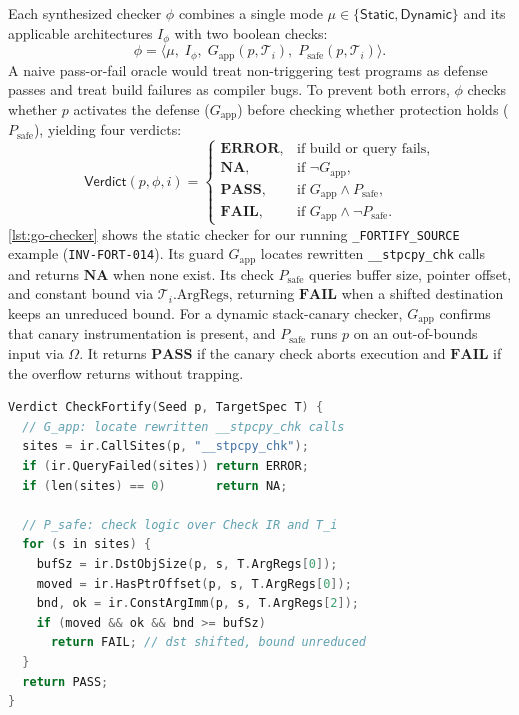 \documentclass[conference,compsoc]{IEEEtran}
\begin{document}
Each synthesized checker $\phi$ combines a single mode $\mu \in \{\mathsf{Static}, \mathsf{Dynamic}\}$ and its applicable architectures $I_\phi$ with two boolean checks:
\begin{equation}
\phi = \langle \mu,\; I_\phi,\; G_{\text{app}}(p, \mathcal{T}_i),\; P_{\text{safe}}(p, \mathcal{T}_i) \rangle.
\label{eq:pred-ir}
\end{equation}
A naive pass-or-fail oracle would treat non-triggering test programs as defense passes and treat build failures as compiler bugs. To prevent both errors, $\phi$ checks whether $p$ activates the defense ($G_{\text{app}}$) before checking whether protection holds ($P_{\text{safe}}$), yielding four verdicts:
\begin{equation}
\mathsf{Verdict}(p, \phi, i) = \begin{cases}
\mathbf{ERROR}, & \text{if build or query fails,} \\
\mathbf{NA}, & \text{if } \neg G_{\text{app}}, \\
\mathbf{PASS}, & \text{if } G_{\text{app}} \wedge P_{\text{safe}}, \\
\mathbf{FAIL}, & \text{if } G_{\text{app}} \wedge \neg P_{\text{safe}}.
\end{cases}
\label{eq:inference-rules}
\end{equation}
\autoref{lst:go-checker} shows the static checker for our running \texttt{\_FORTIFY\_SOURCE} example (\texttt{INV-FORT-014}). Its guard $G_{\text{app}}$ locates rewritten \texttt{\_\_stpcpy\_chk} calls and returns $\mathbf{NA}$ when none exist. Its check $P_{\text{safe}}$ queries buffer size, pointer offset, and constant bound via $\mathcal{T}_i.\text{ArgRegs}$, returning $\mathbf{FAIL}$ when a shifted destination keeps an unreduced bound. For a dynamic stack-canary checker, $G_{\text{app}}$ confirms that canary instrumentation is present, and $P_{\text{safe}}$ runs $p$ on an out-of-bounds input via $\Omega$. It returns $\mathbf{PASS}$ if the canary check aborts execution and $\mathbf{FAIL}$ if the overflow returns without trapping.

\begin{lstlisting}[float=t, language=C, morekeywords={return,if,for,in,len,Seed,TargetSpec,Verdict,ERROR,NA,PASS,FAIL}, numbers=none, xleftmargin=3pt, framexleftmargin=0pt, caption={Static checker for \texttt{INV-FORT-014} combining Check~IR primitives $\Omega$ and target specification $\mathcal{T}_i$.}, label={lst:go-checker}]
Verdict CheckFortify(Seed p, TargetSpec T) {
  // G_app: locate rewritten __stpcpy_chk calls
  sites = ir.CallSites(p, "__stpcpy_chk");
  if (ir.QueryFailed(sites)) return ERROR;
  if (len(sites) == 0)       return NA;

  // P_safe: check logic over Check IR and T_i
  for (s in sites) {
    bufSz = ir.DstObjSize(p, s, T.ArgRegs[0]);
    moved = ir.HasPtrOffset(p, s, T.ArgRegs[0]);
    bnd, ok = ir.ConstArgImm(p, s, T.ArgRegs[2]);
    if (moved && ok && bnd >= bufSz)
      return FAIL; // dst shifted, bound unreduced
  }
  return PASS;
}
\end{lstlisting}
\end{document}
